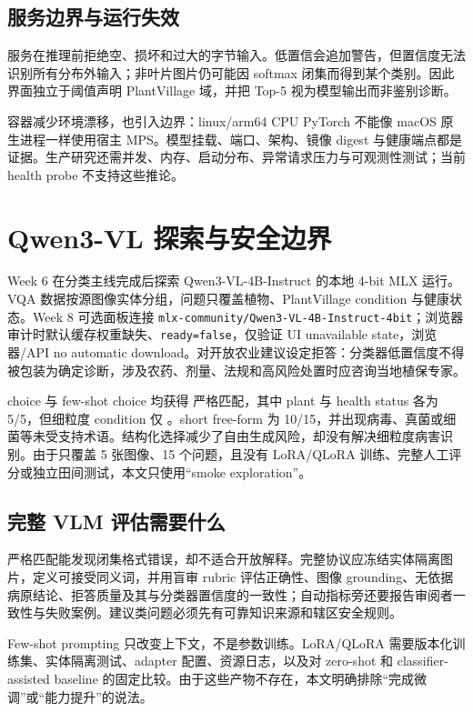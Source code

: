 \documentclass[UTF8,11pt]{ctexart}
\begin{document}
\subsection*{服务边界与运行失效}

服务在推理前拒绝空、损坏和过大的字节输入。低置信会追加警告，但置信度无法识别所有分布外输入；非叶片图片仍可能因 softmax 闭集而得到某个类别。因此界面独立于阈值声明 PlantVillage 域，并把 Top-5 视为模型输出而非鉴别诊断。

容器减少环境漂移，也引入边界：linux/arm64 CPU PyTorch 不能像 macOS 原生进程一样使用宿主 MPS。模型挂载、端口、架构、镜像 digest 与健康端点都是证据。生产研究还需并发、内存、启动分布、异常请求压力与可观测性测试；当前 health probe 不支持这些推论。

\section{Qwen3-VL 探索与安全边界}

Week 6 在分类主线完成后探索 Qwen3-VL-4B-Instruct 的本地 4-bit MLX 运行。VQA 数据按源图像实体分组，问题只覆盖植物、PlantVillage condition 与健康状态。Week 8 可选面板连接 \nolinkurl{mlx-community/Qwen3-VL-4B-Instruct-4bit}；浏览器审计时默认缓存权重缺失、\texttt{ready=false}，仅验证 UI unavailable state，浏览器/API no automatic download。对开放农业建议设定拒答：分类器低置信度不得被包装为确定诊断，涉及农药、剂量、法规和高风险处置时应咨询当地植保专家。



choice 与 few-shot choice 均获得 \PDAVLMChoice 严格匹配，其中 plant 与 health status 各为 5/5，但细粒度 condition 仅 \PDAVLMCondition。short free-form 为 10/15，并出现病毒、真菌或细菌等未受支持术语。结构化选择减少了自由生成风险，却没有解决细粒度病害识别。由于只覆盖 5 张图像、15 个问题，且没有 LoRA/QLoRA 训练、完整人工评分或独立田间测试，本文只使用“smoke exploration”。

\subsection*{完整 VLM 评估需要什么}

严格匹配能发现闭集格式错误，却不适合开放解释。完整协议应冻结实体隔离图片，定义可接受同义词，并用盲审 rubric 评估正确性、图像 grounding、无依据病原结论、拒答质量及其与分类器置信度的一致性；自动指标旁还要报告审阅者一致性与失败案例。建议类问题必须先有可靠知识来源和辖区安全规则。

Few-shot prompting 只改变上下文，不是参数训练。LoRA/QLoRA 需要版本化训练集、实体隔离测试、adapter 配置、资源日志，以及对 zero-shot 和 classifier-assisted baseline 的固定比较。由于这些产物不存在，本文明确排除“完成微调”或“能力提升”的说法。
\end{document}
